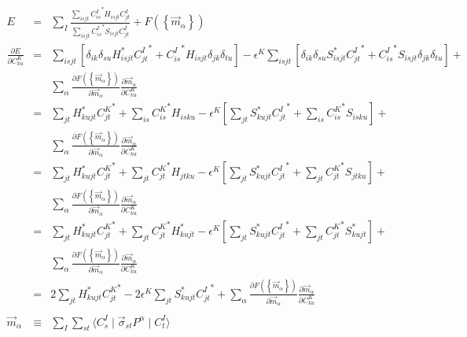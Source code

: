 \documentclass{article}
\begin{document}
\begin{eqnarray*}
E & = & \sum_I \frac{ \sum_{isjt}{ {C^I_{is}}^* H_{isjt} C^I_{jt}}}{\sum_{isjt} { {C^I_{is}}^* S_{isjt} C^I_{jt}} }  +
  F(\left\{ \vec{m}_\alpha \right\} ) \\
\frac{\partial E}{\partial C^K_{ku}} & = &
  \sum_{isjt} \left[ \delta_{ik} \delta_{su} H_{isjt}^* {C^I_{jt}}^* + {C^I_{is}}^* H_{isjt} \delta_{jk} \delta_{tu} \right] -
  \epsilon^K \sum_{isjt} \left[ \delta_{ik} \delta_{su} S_{isjt}^* {C^I_{jt}}^* + {C^I_{is}}^* S_{isjt} \delta_{jk} \delta_{tu} \right] + \\
& & \sum_\alpha \frac{\partial F( \left\{ \vec{m}_\alpha \right\} )}{\partial \vec{m}_\alpha}
                \frac{\partial \vec{m}_\alpha}{\partial C^K_{ku}} \\
 & = & \sum_{jt} H_{kujt}^* {C^K_{jt}}^* + \sum_{is} {C^K_{is}}^* H_{isku} -
       \epsilon^K \left[ \sum_{jt} S_{kujt}^* {C^I_{jt}}^* + \sum_{is} {C^K_{is}}^* S_{isku} \right] + \\
& & \sum_\alpha \frac{\partial F( \left\{ \vec{m}_\alpha \right\} )}{\partial \vec{m}_\alpha}
                \frac{\partial \vec{m}_\alpha}{\partial C^K_{ku}} \\
 & = & \sum_{jt} H_{kujt}^* {C^K_{jt}}^* + \sum_{jt} {C^K_{jt}}^* H_{jtku} -
       \epsilon^K \left[ \sum_{jt} S_{kujt}^* {C^I_{jt}}^* + \sum_{jt} {C^K_{jt}}^* S_{jtku} \right] + \\
& & \sum_\alpha \frac{\partial F( \left\{ \vec{m}_\alpha \right\} )}{\partial \vec{m}_\alpha}
                \frac{\partial \vec{m}_\alpha}{\partial C^K_{ku}} \\
 & = & \sum_{jt} H_{kujt}^* {C^K_{jt}}^* + \sum_{jt} {C^K_{jt}}^* H_{kujt}^* -
       \epsilon^K \left[ \sum_{jt} S_{kujt}^* {C^I_{jt}}^* + \sum_{jt} {C^K_{jt}}^* S_{kujt}^* \right] + \\
& & \sum_\alpha \frac{\partial F( \left\{ \vec{m}_\alpha \right\} )}{\partial \vec{m}_\alpha}
                \frac{\partial \vec{m}_\alpha}{\partial C^K_{ku}} \\
 & = & 2 \sum_{jt} H_{kujt}^* {C^K_{jt}}^* - 2 \epsilon^K \sum_{jt} S_{kujt}^* {C^I_{jt}}^* + 
   \sum_\alpha \frac{\partial F( \left\{ \vec{m}_\alpha \right\} )}{\partial \vec{m}_\alpha}
                \frac{\partial \vec{m}_\alpha}{\partial C^K_{ku}} \\
\\
\vec{m}_\alpha & \equiv & \sum_I \sum_{st} \langle C^I_s \mid \vec{\sigma}_{st} P^\alpha \mid C^I_t \rangle \\
\\

\end{eqnarray*}
\end{document}
